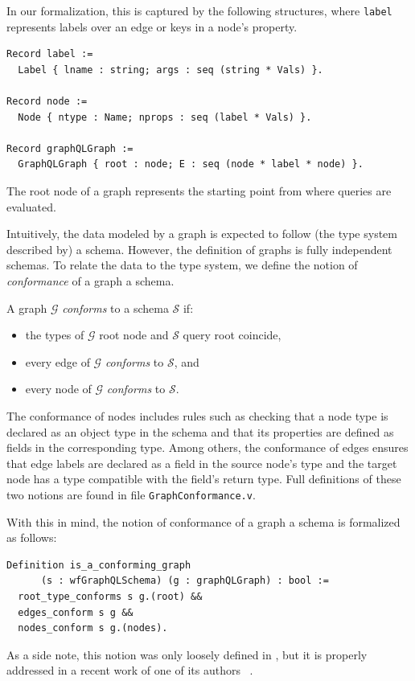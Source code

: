 In our formalization, this is captured by the following structures, where \texttt{label} represents labels over an edge or keys in a node's property. 
%
\begin{verbatim}
Record label := 
  Label { lname : string; args : seq (string * Vals) }.

Record node := 
  Node { ntype : Name; nprops : seq (label * Vals) }.

Record graphQLGraph := 
  GraphQLGraph { root : node; E : seq (node * label * node) }.
\end{verbatim}
%
 The root node of a \gql graph represents the starting point from where queries are evaluated.

Intuitively, the data modeled by a \gql graph is expected to follow (the type system described by) a schema. However, the definition of graphs is fully independent schemas. To relate the data to the type system, we define the notion of \textit{conformance} of a graph \wrt a schema.
%
\begin{definition}
A \gql graph $\mathcal{G}$ \textit{conforms} to a schema $\mathcal{S}$ if:
\begin{itemize}
    \item the types of $\mathcal{G}$ root node and $\mathcal{S}$ query root coincide, 
    \item every edge of $\mathcal{G}$ \textit{conforms} to $\mathcal{S}$, and
    \item every node of $\mathcal{G}$ \textit{conforms} to $\mathcal{S}$.
\end{itemize}
\end{definition}
%
The conformance of nodes includes rules such as checking that a node type is declared as an object type in the schema and that its properties are defined as fields in the corresponding type. Among others, the conformance of edges ensures that edge labels are declared as a field in the source node's type and the target node has a type compatible with the field's return type. Full definitions of these two notions are found in file \texttt{GraphConformance.v}.

With this in mind, the notion of conformance of a graph \wrt a schema is formalized as follows:
%
\begin{verbatim}
Definition is_a_conforming_graph 
      (s : wfGraphQLSchema) (g : graphQLGraph) : bool :=
  root_type_conforms s g.(root) &&
  edges_conform s g &&
  nodes_conform s g.(nodes).
\end{verbatim}
%
As a side note, this notion was only loosely defined in \HP, but it is properly addressed in a recent work of one of its authors ~\cite{olafschema}.


